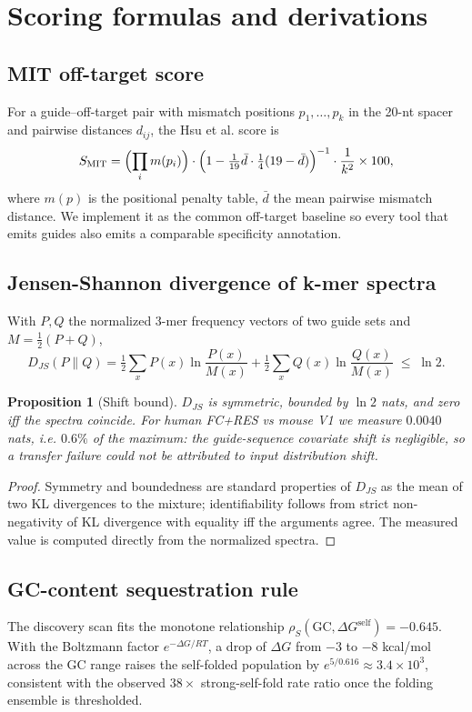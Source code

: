 \documentclass[12pt]{article}
\newtheorem{proposition}{Proposition}
\begin{document}







\section{Scoring formulas and derivations}
\subsection{MIT off-target score}
For a guide--off-target pair with mismatch positions $p_1,\dots,p_k$ in the
20-nt spacer and pairwise distances $d_{ij}$, the Hsu et al. score is
\begin{equation}
S_{\text{MIT}} = \Bigl(\prod_{i} m(p_i)\Bigr)\cdot
\Bigl(1 - \tfrac{1}{19}\bar{d}\cdot\tfrac{1}{4}(19-\bar{d})\Bigr)^{-1}\cdot
\frac{1}{k^2}\times 100,
\end{equation}
where $m(p)$ is the positional penalty table, $\bar{d}$ the mean pairwise
mismatch distance. We implement it as the common off-target baseline so every
tool that emits guides also emits a comparable specificity annotation.
\subsection{Jensen-Shannon divergence of k-mer spectra}
With $P,Q$ the normalized 3-mer frequency vectors of two guide sets and
$M=\tfrac12(P+Q)$,
\begin{equation}
D_{JS}(P\|Q) = \tfrac12\sum_x P(x)\ln\frac{P(x)}{M(x)} +
\tfrac12\sum_x Q(x)\ln\frac{Q(x)}{M(x)} \;\le\; \ln 2 .
\end{equation}
\begin{proposition}[Shift bound]
$D_{JS}$ is symmetric, bounded by $\ln 2$ nats, and zero iff the spectra
coincide. For human FC+RES vs mouse V1 we measure $0.0040$ nats, i.e.
$0.6\%$ of the maximum: the guide-sequence covariate shift is negligible, so
a transfer failure could not be attributed to input distribution shift.
\end{proposition}
\begin{proof}
Symmetry and boundedness are standard properties of $D_{JS}$ as the mean of
two KL divergences to the mixture; identifiability follows from strict
non-negativity of KL divergence with equality iff the arguments agree. The
measured value is computed directly from the normalized spectra.
\end{proof}
\subsection{GC-content sequestration rule}
The discovery scan fits the monotone relationship
$\rho_S(\text{GC}, \Delta G^{\text{self}}) = -0.645$. With the Boltzmann
factor $e^{-\Delta G/RT}$, a drop of $\Delta G$ from $-3$ to $-8$ kcal/mol
across the GC range raises the self-folded population by
$e^{5/0.616} \approx 3.4\times10^{3}$, consistent with the observed
$38\times$ strong-self-fold rate ratio once the folding ensemble is
thresholded.
\end{document}
